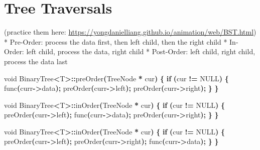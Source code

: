 \documentclass[
]{book}
\newenvironment{Shaded}{\begin{snugshade}}{\end{snugshade}}
\newcommand{\ControlFlowTok}[1]{\textcolor[rgb]{0.13,0.29,0.53}{\textbf{#1}}}
\newcommand{\DataTypeTok}[1]{\textcolor[rgb]{0.13,0.29,0.53}{#1}}
\newcommand{\NormalTok}[1]{#1}
\newcommand{\OperatorTok}[1]{\textcolor[rgb]{0.81,0.36,0.00}{\textbf{#1}}}
\begin{document}
\hypertarget{tree-traversals}{%
\section{Tree Traversals}\label{tree-traversals}}

(practice them here: \url{https://yongdanielliang.github.io/animation/web/BST.html})
* Pre-Order: process the data first, then left child, then the right child
* In-Order: left child, process the data, right child
* Post-Order: left child, right child, process the data last

\begin{Shaded}
\begin{Highlighting}[]
\DataTypeTok{void}\NormalTok{ BinaryTree}\OperatorTok{\textless{}}\NormalTok{T}\OperatorTok{\textgreater{}::}\NormalTok{preOrder}\OperatorTok{(}\NormalTok{TreeNode }\OperatorTok{*}\NormalTok{ cur}\OperatorTok{)} \OperatorTok{\{}
    \ControlFlowTok{if} \OperatorTok{(}\NormalTok{cur }\OperatorTok{!=}\NormalTok{ NULL}\OperatorTok{)} \OperatorTok{\{}
\NormalTok{        func}\OperatorTok{(}\NormalTok{curr}\OperatorTok{{-}\textgreater{}}\NormalTok{data}\OperatorTok{);}
\NormalTok{        preOrder}\OperatorTok{(}\NormalTok{curr}\OperatorTok{{-}\textgreater{}}\NormalTok{left}\OperatorTok{);}
\NormalTok{        preOrder}\OperatorTok{(}\NormalTok{curr}\OperatorTok{{-}\textgreater{}}\NormalTok{right}\OperatorTok{);}
    \OperatorTok{\}}
\OperatorTok{\}}

\DataTypeTok{void}\NormalTok{ BinaryTree}\OperatorTok{\textless{}}\NormalTok{T}\OperatorTok{\textgreater{}::}\NormalTok{inOrder}\OperatorTok{(}\NormalTok{TreeNode }\OperatorTok{*}\NormalTok{ cur}\OperatorTok{)} \OperatorTok{\{}
    \ControlFlowTok{if} \OperatorTok{(}\NormalTok{cur }\OperatorTok{!=}\NormalTok{ NULL}\OperatorTok{)} \OperatorTok{\{}
\NormalTok{        preOrder}\OperatorTok{(}\NormalTok{curr}\OperatorTok{{-}\textgreater{}}\NormalTok{left}\OperatorTok{);}
\NormalTok{        func}\OperatorTok{(}\NormalTok{curr}\OperatorTok{{-}\textgreater{}}\NormalTok{data}\OperatorTok{);}
\NormalTok{        preOrder}\OperatorTok{(}\NormalTok{curr}\OperatorTok{{-}\textgreater{}}\NormalTok{right}\OperatorTok{);}
    \OperatorTok{\}}
\OperatorTok{\}}

\DataTypeTok{void}\NormalTok{ BinaryTree}\OperatorTok{\textless{}}\NormalTok{T}\OperatorTok{\textgreater{}::}\NormalTok{inOrder}\OperatorTok{(}\NormalTok{TreeNode }\OperatorTok{*}\NormalTok{ cur}\OperatorTok{)} \OperatorTok{\{}
    \ControlFlowTok{if} \OperatorTok{(}\NormalTok{cur }\OperatorTok{!=}\NormalTok{ NULL}\OperatorTok{)} \OperatorTok{\{}
\NormalTok{        preOrder}\OperatorTok{(}\NormalTok{curr}\OperatorTok{{-}\textgreater{}}\NormalTok{left}\OperatorTok{);}
\NormalTok{        preOrder}\OperatorTok{(}\NormalTok{curr}\OperatorTok{{-}\textgreater{}}\NormalTok{right}\OperatorTok{);}
\NormalTok{        func}\OperatorTok{(}\NormalTok{curr}\OperatorTok{{-}\textgreater{}}\NormalTok{data}\OperatorTok{);}
    \OperatorTok{\}}
\OperatorTok{\}}
\end{Highlighting}
\end{Shaded}
\end{document}
